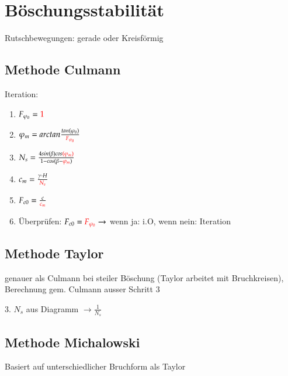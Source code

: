 \section{Böschungsstabilität}

Rutschbewegungen: gerade oder Kreisförmig

\subsection{Methode Culmann}
	\begin{minipage}{\linewidth}
		Iteration:
		\begin{enumerate}
			\item $ F_{\varphi_0} = \textcolor{red}{1} $
			\item $ \varphi_m = arctan \frac{tan (\varphi_0)}{\textcolor{red}{F_{\varphi_0}}} $
			\item $ N_s = \frac{4 sin (\beta) cos \textcolor{red}{(\varphi_m)}}{1 - cos (\beta - \textcolor{red}{\varphi_m})} $
			\item $ c_m = \frac{\gamma \cdot H}{\textcolor{red}{N_s}} $
			\item $ F_{c0} = \frac{c}{\textcolor{red}{c_m}} $
			\item Überprüfen: $ F_{c0} = \textcolor{red}{F_{\varphi_0}} \rightarrow $ wenn ja: i.O, wenn nein: Iteration
		\end{enumerate}
	\end{minipage}


\subsection{Methode Taylor}
	\begin{minipage}{\linewidth}
		genauer als Culmann bei steiler Böschung (Taylor arbeitet mit Bruchkreisen), Berechnung gem. Culmann ausser Schritt 3
		
		\hspace{0.5cm} 3. $ N_s $ aus Diagramm $ \rightarrow \frac{1}{N_s} $
	\end{minipage}

\subsection{Methode Michalowski}
	\begin{minipage}{\linewidth}
		Basiert auf unterschiedlicher Bruchform als Taylor \\
	\end{minipage}
